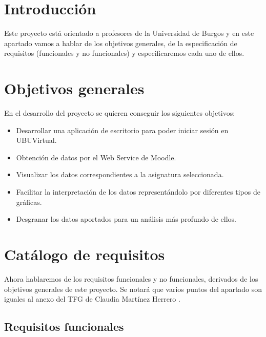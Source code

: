 
\section{Introducción}

Este proyecto está orientado a profesores de la Universidad de Burgos y en este apartado vamos a hablar de los objetivos generales, de la especificación de requisitos (funcionales y no funcionales) y especificaremos cada uno de ellos.

\section{Objetivos generales}

En el desarrollo del proyecto se quieren conseguir los siguientes objetivos:

\begin{itemize}
	\tightlist
	\item
	Desarrollar una aplicación de escritorio para poder iniciar sesión en UBUVirtual.
	\item
	Obtención de datos por el Web Service de Moodle.
	\item
	Visualizar los datos correspondientes a la asignatura seleccionada.
	\item
	Facilitar la interpretación de los datos representándolo por diferentes tipos de gráficas.
	\item
	Desgranar los datos aportados para un análisis más profundo de ellos.
\end{itemize}

\section{Catálogo de requisitos}

Ahora hablaremos de los requisitos funcionales y no funcionales, derivados de los objetivos generales de este proyecto. Se notará que varios puntos del apartado son iguales al anexo del TFG de Claudia Martínez Herrero \cite{claudia:anexo}.

\subsection{Requisitos funcionales}\label{requisitos-funcionales}


